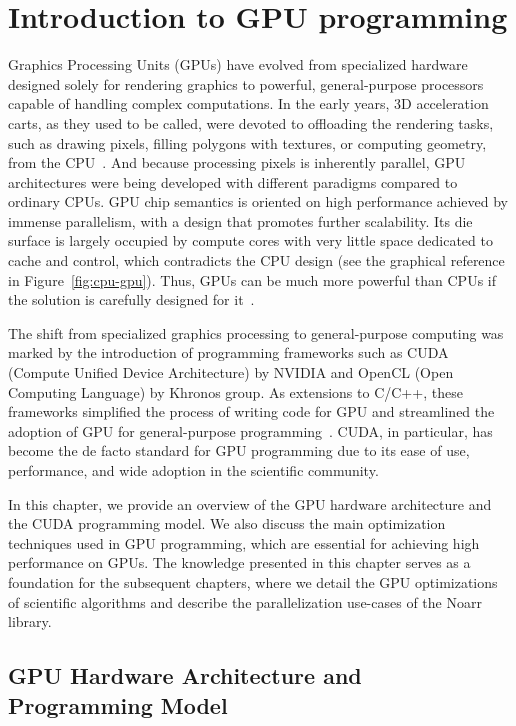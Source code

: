 \chapter{Introduction to GPU programming}
\label{chap:gpu_intro}


Graphics Processing Units (GPUs) have evolved from specialized hardware designed solely for rendering graphics to powerful, general-purpose processors capable of handling complex computations. In the early years, 3D acceleration carts, as they used to be called, were devoted to offloading the rendering tasks, such as drawing pixels, filling polygons with textures, or computing geometry, from the CPU~\cite{pratx2011gpu}. And because processing pixels is inherently parallel, GPU architectures were being developed with different paradigms compared to ordinary CPUs. GPU chip semantics is oriented on high performance achieved by immense parallelism, with a design that promotes further scalability. Its die surface is largely occupied by compute cores with very little space dedicated to cache and control, which contradicts the CPU design (see the graphical reference in Figure~\ref{fig:cpu-gpu}). Thus, GPUs can be much more powerful than CPUs if the solution is carefully designed for it~\cite{navarro2014survey}.

The shift from specialized graphics processing to general-purpose computing was marked by the introduction of programming frameworks such as CUDA (Compute Unified Device Architecture) by NVIDIA and OpenCL (Open Computing Language) by Khronos group. As extensions to C/C++, these frameworks simplified the process of writing code for GPU and streamlined the adoption of GPU for general-purpose programming~\cite{croix2009introduction}. CUDA, in particular, has become the de facto standard for GPU programming due to its ease of use, performance, and wide adoption in the scientific community.

In this chapter, we provide an overview of the GPU hardware architecture and the CUDA programming model. We also discuss the main optimization techniques used in GPU programming, which are essential for achieving high performance on GPUs. The knowledge presented in this chapter serves as a foundation for the subsequent chapters, where we detail the GPU optimizations of scientific algorithms and describe the parallelization use-cases of the Noarr library.

\section{GPU Hardware Architecture and Programming Model}

